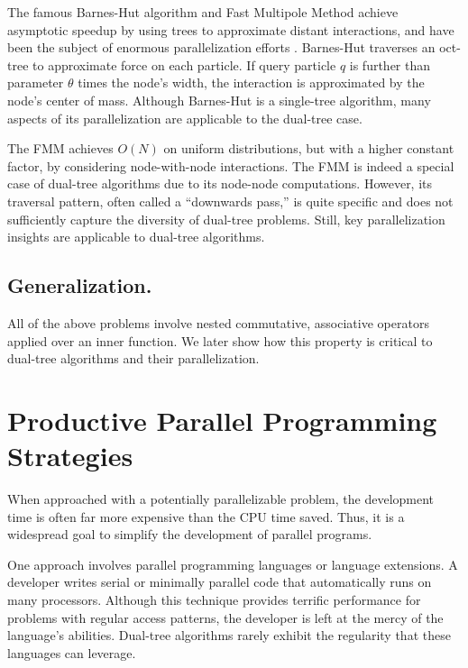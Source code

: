 \documentclass[twoside,leqno,twocolumn]{article}
\newcommand{\mysub}[1]{\subsection{#1.}}
\begin{document}
The famous Barnes-Hut algorithm \cite{barnes_hut} and Fast Multipole Method \cite{greengard_fmm} achieve asymptotic speedup by using trees to approximate distant interactions, and have been the subject of enormous parallelization efforts \cite{singh_thesis, salmon_thesis, liu94experiences, salmon97parallel,singh92implications, singh95load, warren95portable}.
Barnes-Hut \cite{barnes_hut} traverses an oct-tree to approximate force on each particle.
If query particle $q$ is further than parameter $\theta$ times the node's width, the interaction is approximated by the node's center of mass.
Although Barnes-Hut is a single-tree algorithm, many aspects of its parallelization are applicable to the dual-tree case.

The FMM \cite{greengard_fmm} achieves $O(N)$ on uniform distributions, but with a higher constant factor, by considering node-with-node interactions.
The FMM is indeed a special case of dual-tree algorithms due to its node-node computations.
However, its traversal pattern, often called a ``downwards pass,'' is quite specific and does not sufficiently capture the diversity of dual-tree problems.
Still, key parallelization insights are applicable to dual-tree algorithms.

\mysub{Generalization}
All of the above problems involve nested commutative, associative operators applied over an inner function.
We later show how this property is critical to dual-tree algorithms and their parallelization.


\section{Productive Parallel Programming Strategies}

When approached with a potentially parallelizable problem, the development time is often far more expensive than the CPU time saved.
Thus, it is a widespread goal to simplify the development of parallel programs.

One approach involves parallel programming languages or language extensions.
A developer writes serial or minimally parallel code that automatically runs on many processors.
Although this technique provides terrific performance for problems with regular access patterns, the developer is left at the mercy of the language's abilities.
Dual-tree algorithms rarely exhibit the regularity that these languages can leverage.
\end{document}
